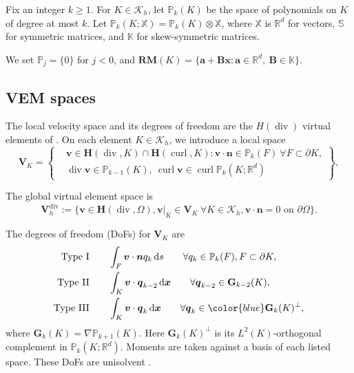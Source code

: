 \documentclass[review,hidelinks,onefignum,onetabnum]{siamart251216}
\newcommand{\AI}[1]{{\color{blue}#1}}
\begin{document}
\AI{Fix an integer $k\geq1$.} For \(K \in \mathcal{K}_h\), let \(\mathbb{P}_k(K)\) be the space of polynomials on \(K\) of degree at most \(k\). Let \(\mathbb{P}_k(K; \mathbb{X}) = \mathbb{P}_k(K) \otimes \mathbb{X}\), where \(\mathbb{X}\) is \(\mathbb{R}^d\) for vectors, \(\mathbb{S}\) for symmetric matrices, and \(\mathbb{K}\) for skew-symmetric matrices.

\AI{We set $\mathbb P_j=\{0\}$ for $j<0$, and
$\mathbf{RM}(K)=\{\boldsymbol a+\boldsymbol B\boldsymbol x:
\boldsymbol a\in\mathbb R^d,\ \boldsymbol B\in\mathbb K\}$.}

\subsection{VEM spaces}

\AI{The local velocity space and its degrees of freedom are the
$H(\operatorname{div})$ virtual elements of \cite{BBMR2016}.}
On each element \(K\in\mathcal{K}_h\),  we introduce a local space
\begin{equation*}
\boldsymbol{V}_K = \left\{ 
\begin{aligned}
& \boldsymbol{v} \in \boldsymbol{H}(\operatorname{div}, K) \cap \boldsymbol{H}(\operatorname{curl}, K) : \boldsymbol{v} \cdot \boldsymbol{n} \in \mathbb{P}_k(F) \ \forall F \subset \partial K, \\
& \operatorname{div} \boldsymbol{v} \in \mathbb{P}_{k-1}(K), \ \operatorname{curl} \boldsymbol{v} \in \operatorname{curl} \mathbb{P}_k(K;\mathbb{R}^d)
\end{aligned}
\right\},
\end{equation*}

The global virtual element space is
\begin{equation*}
\boldsymbol{V}_h^{\operatorname{div}} := \{ \boldsymbol{v} \in \boldsymbol{H}(\operatorname{div}, \Omega), \boldsymbol{v}|_K \in \boldsymbol{V}_K \ \forall K \in \mathcal{K}_h, \boldsymbol{v} \cdot \boldsymbol{n} = 0 \text{ on } \partial \Omega \} .
\end{equation*}


The degrees of freedom (DoFs) for $\boldsymbol V_K$ are
\begin{align*}
\text{Type I} \qquad & \int_F \boldsymbol{v} \cdot \boldsymbol{n} q_k \, \mathrm{d}s \qquad \forall q_k \in \mathbb{P}_k(F), F \subset \partial K, \\
\text{Type II} \qquad & \int_K \boldsymbol{v} \cdot \boldsymbol{q}_{k-2} \, \mathrm{d}\boldsymbol{x} \qquad \forall \boldsymbol{q}_{k-2} \in \mathbf{G}_{k-2}(K), \\
\text{Type III} \qquad & \int_K \boldsymbol{v} \cdot \boldsymbol{q}_k \, \mathrm{d}\boldsymbol{x} \qquad \forall \boldsymbol{q}_k \in \AI{\mathbf G_k(K)^\perp},
\end{align*}
where $\mathbf G_k(K)=\nabla\mathbb P_{k+1}(K)$.
\AI{Here $\mathbf G_k(K)^\perp$ is its $L^2(K)$-orthogonal complement in
$\mathbb P_k(K;\mathbb R^d)$. Moments are taken against a basis of each
listed space. These DoFs are unisolvent \cite{BBMR2016}.}
\end{document}
